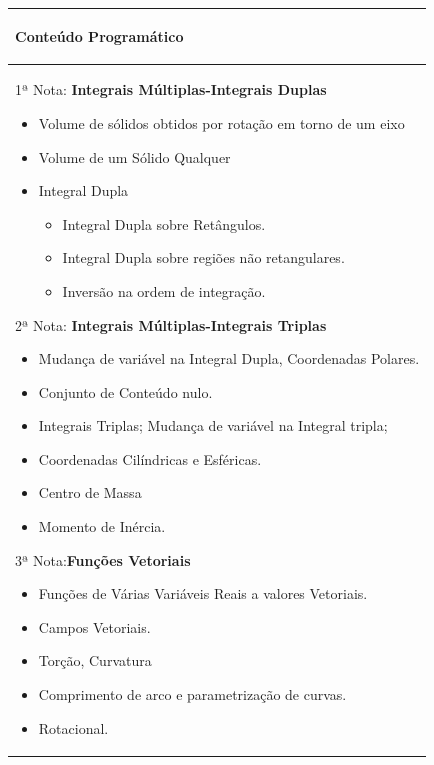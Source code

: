 \documentclass[12pt,a4paper]{article}
\begin{document}
\hspace{-1.65cm}
\begin{tabular}{|p{16.8cm}|}
\hline
\begin{center}
  {\bf Conteúdo Programático}
\end{center}\\
\hline
1ª Nota: \textbf{Integrais Múltiplas-Integrais Duplas}
\begin{itemize}

  \item Volume de sólidos obtidos por rotação em torno de um eixo
  \item Volume de um Sólido Qualquer
  \item Integral Dupla
  \begin{itemize}
    \item Integral Dupla sobre Retângulos.
    \item Integral Dupla sobre regiões não retangulares.
    \item Inversão na ordem de integração.
  \end{itemize}

\end{itemize}

2ª Nota: \textbf{Integrais Múltiplas-Integrais Triplas}

\begin{itemize}
  \item Mudança de variável na Integral Dupla, Coordenadas Polares.
  \item Conjunto de Conteúdo nulo.
  \item Integrais Triplas; Mudança de variável na Integral tripla;
  \item Coordenadas Cilíndricas e Esféricas.
  \item Centro de Massa
  \item Momento de Inércia.
\end{itemize}

3ª Nota:\textbf{Funções Vetoriais}

\begin{itemize}
  \item Funções de Várias Variáveis Reais a valores Vetoriais.
  \item Campos Vetoriais.
  \item Torção, Curvatura
  \item Comprimento de arco e parametrização de curvas.
  \item Rotacional.
\end{itemize}
\\ \hline
\end{tabular}
\end{document}
